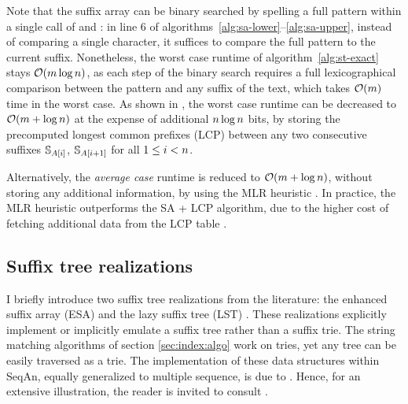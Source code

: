 Note that the suffix array can be binary searched by spelling a full pattern within a single call of  and : in line 6 of algorithms~\ref{alg:sa-lower}--\ref{alg:sa-upper}, instead of comparing a single character, it suffices to compare the full pattern to the current suffix.
Nonetheless, the worst case runtime of algorithm~\ref{alg:st-exact} stays $\mathcal{O}(m \log{n})$, as each step of the binary search requires a full lexicographical comparison between the pattern and any suffix of the text, which takes $\mathcal{O}(m)$ time in the worst case.
As shown in \citep{Manber1990}, the worst case runtime can be decreased to $\mathcal{O}(m + \log{n})$ at the expense of additional $n \log{n}$ bits, by storing the precomputed longest common prefixes (LCP) between any two consecutive suffixes $\mathbb{S}_{A[i]}$, $\mathbb{S}_{A[i+1]}$ for all $1 \leq i < n$.

Alternatively, the \emph{average case} runtime is reduced to $\mathcal{O}(m + \log{n})$, without storing any additional information, by using the MLR heuristic \citep{Manber1990}.
In practice, the MLR heuristic outperforms the SA + LCP algorithm, due to the higher cost of fetching additional data from the LCP table \citep{Weese2013}.


\subsection{Suffix tree realizations}
\label{sec:index:stree}

I briefly introduce two suffix tree realizations from the literature: the enhanced suffix array (ESA) \citep{Abouelhoda2004} and the lazy suffix tree (LST) \citep{Giegerich2003}.
These realizations explicitly implement or implicitly emulate a suffix tree rather than a suffix trie.
The string matching algorithms of section \ref{sec:index:algo} work on tries, yet any tree can be easily traversed as a trie.
The implementation of these data structures within SeqAn, equally generalized to multiple sequence, is due to \citeauthor{Weese2013}.
Hence, for an extensive illustration, the reader is invited to consult \citep{Weese2013}.

